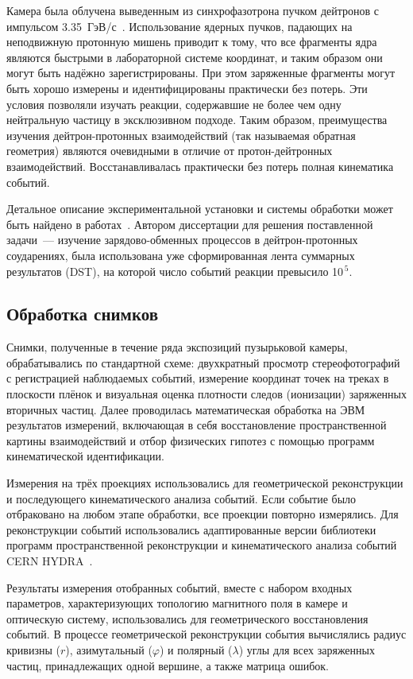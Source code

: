 Камера была облучена выведенным из синхрофазотрона пучком дейтронов с импульсом
3.35~ГэВ/с~\cite{glagolev72}. Использование ядерных пучков, падающих на
неподвижную протонную мишень приводит к тому, что все фрагменты ядра являются
быстрыми в лабораторной системе координат, и таким образом они могут быть
надёжно зарегистрированы. При этом заряженные фрагменты могут быть хорошо
измерены и идентифицированы практически без потерь. Эти условия позволяли
изучать реакции, содержавшие не более чем одну нейтральную частицу в
эксклюзивном подходе. Таким образом, преимущества изучения дейтрон-протонных
взаимодействий (так называемая обратная геометрия) являются очевидными в отличие
от протон-дейтронных взаимодействий. Восстанавливалась практически без потерь
полная кинематика событий.

Детальное описание экспериментальной установки и системы обработки может быть
найдено в работах~\cite{belon65,alad75,alad73}. Автором диссертации для решения
поставленной задачи~--- изучение зарядово-обменных процессов в дейтрон-протонных
соударениях, была использована уже сформированная лента суммарных результатов
(DST), на которой число событий реакции \dpfrag превысило 10$^{\,5}$.

\subsection{Обработка снимков}
Снимки, полученные в течение ряда экспозиций пузырьковой камеры, обрабатывались
по стандартной схеме: двухкратный просмотр стереофотографий с регистрацией
наблюдаемых событий, измерение координат точек на треках в плоскости плёнок и
визуальная оценка плотности следов (ионизации) заряженных вторичных частиц.
Далее проводилась математическая обработка на ЭВМ результатов измерений,
включающая в себя восстановление пространственной картины взаимодействий и отбор
физических гипотез с помощью программ кинематической идентификации.

Измерения на трёх проекциях использовались для геометрической реконструкции и
последующего кинематического анализа событий. Если событие было отбраковано на
любом этапе обработки, все проекции повторно измерялись. Для реконструкции
событий использовались адаптированные версии библиотеки программ
пространственной реконструкции и кинематического анализа событий
CERN HYDRA~\cite{framer82}.

Результаты измерения отобранных событий, вместе с набором входных параметров,
характеризующих топологию магнитного поля в камере и оптическую систему,
использовались для геометрического восстановления событий. В процессе
геометрической реконструкции события вычислялись радиус кривизны ($r$),
азимутальный ($\varphi$) и полярный ($\lambda$) углы для всех заряженных частиц,
принадлежащих одной вершине, а также матрица ошибок.

